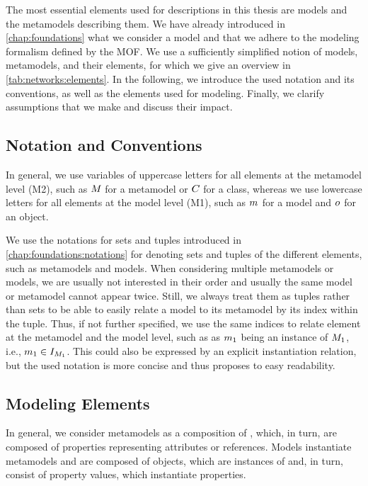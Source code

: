 The most essential elements used for descriptions in this thesis are models and the metamodels describing them.
We have already introduced in \autoref{chap:foundations} what we consider a model and that we adhere to the modeling formalism defined by the \gls{MOF}.
We use a sufficiently simplified notion of models, metamodels, and their elements, for which we give an overview in \autoref{tab:networks:elements}.
In the following, we introduce the used notation and its conventions, as well as the elements used for modeling.
Finally, we clarify assumptions that we make and discuss their impact.


\subsection{Notation and Conventions}

In general, we use variables of uppercase letters for all elements at the metamodel level (M2), such as $M_{}$ for a metamodel or $C_{}$ for a class, whereas we use lowercase letters for all elements at the model level (M1), such as $m_{}$ for a model and $o_{}$ for an object.

We use the notations for sets and tuples introduced in \autoref{chap:foundations:notations} for denoting sets and tuples of the different elements, such as metamodels and models.
When considering multiple metamodels or models, we are usually not interested in their order and usually the same model or metamodel cannot appear twice.
Still, we always treat them as tuples rather than sets to be able to easily relate a model to its metamodel by its index within the tuple.
Thus, if not further specified, we use the same indices to relate element at the metamodel and the model level, such as as $m_{1}$ being an instance of $M_{1}$, i.e., $m_{1} \in I_{M_{1}}$.
This could also be expressed by an explicit instantiation relation, but the used notation is more concise and thus proposes to easy readability.


\subsection{Modeling Elements}

In general, we consider metamodels as a composition of \metaclasses, which, in turn, are composed of properties representing attributes or references.
Models instantiate metamodels and are composed of objects, which are instances of \metaclasses and, in turn, consist of property values, which instantiate properties.

